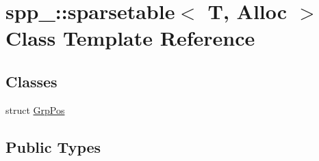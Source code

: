 \hypertarget{classspp___1_1sparsetable}{}\section{spp\+\_\+\+:\+:sparsetable$<$ T, Alloc $>$ Class Template Reference}
\label{classspp___1_1sparsetable}
\subsection*{Classes}
\begin{DoxyCompactItemize}
\item 
struct \hyperlink{structspp___1_1sparsetable_1_1_grp_pos}{Grp\+Pos}
\end{DoxyCompactItemize}
\subsection*{Public Types}
